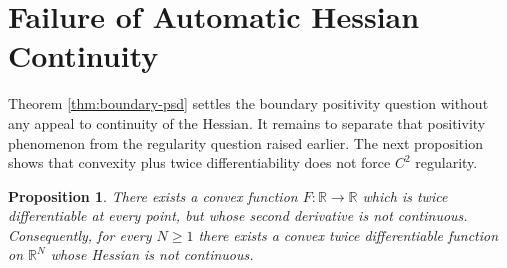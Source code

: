 \documentclass[reqno]{amsart}
\newtheorem{proposition}[theorem]{Proposition}
\theoremstyle{definition}
\newcommand{\R}{\mathbb{R}}
\begin{document}
\section{Failure of Automatic Hessian Continuity}\label{sec:hessian-continuity}

Theorem \ref{thm:boundary-psd} settles the boundary positivity question without
any appeal to continuity of the Hessian. It remains to separate that positivity
phenomenon from the regularity question raised earlier. The next proposition
shows that convexity plus twice differentiability does not force $C^2$
regularity.

\begin{proposition}\label{prop:hessian-not-continuous}
There exists a convex function $F \colon \R \to \R$ which is twice
differentiable at every point, but whose second derivative is not continuous.
Consequently, for every $N \geq 1$ there exists a convex twice differentiable
function on $\R^N$ whose Hessian is not continuous.
\end{proposition}
\end{document}
